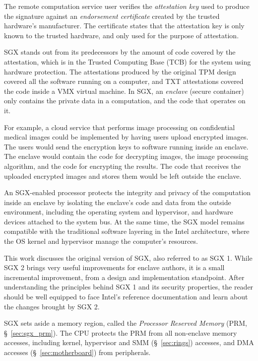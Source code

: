 The remote computation service user verifies the \textit{attestation key} used
to produce the signature against an \textit{endorsement certificate} created by
the trusted hardware's manufacturer. The certificate states that the
attestation key is only known to the trusted hardware, and only used for the
purpose of attestation.

SGX stands out from its predecessors by the amount of code covered by the
attestation, which is in the Trusted Computing Base (TCB) for the system using
hardware protection. The attestations produced by the original TPM design
covered all the software running on a computer, and TXT attestations covered
the code inside a VMX \cite{uhlig2005vmx} virtual machine. In SGX, an
\textit{enclave} (secure container) only contains the private data in a
computation, and the code that operates on it.

For example, a cloud service that performs image processing on confidential
medical images could be implemented by having users upload encrypted images.
The users would send the encryption keys to software running inside an enclave.
The enclave would contain the code for decrypting images, the image processing
algorithm, and the code for encrypting the results. The code that receives the
uploaded encrypted images and stores them would be left outside the enclave.

An SGX-enabled processor protects the integrity and privacy of the computation
inside an enclave by isolating the enclave's code and data from the outside
environment, including the operating system and hypervisor, and hardware
devices attached to the system bus. At the same time, the SGX model remains
compatible with the traditional software layering in the Intel architecture,
where the OS kernel and hypervisor manage the computer's resources.

This work discusses the original version of SGX, also referred to as SGX 1.
While SGX 2 brings very useful improvements for enclave authors, it is a small
incremental improvement, from a design and implementation standpoint. After
understanding the principles behind SGX 1 and its security properties, the
reader should be well equipped to face Intel's reference documentation and
learn about the changes brought by SGX 2.


\label{sec:intro_sgx}

SGX sets aside a memory region, called the \textit{Processor Reserved Memory}
(PRM, \S~\ref{sec:sgx_prm}). The CPU protects the PRM from all non-enclave
memory accesses, including kernel, hypervisor and SMM (\S~\ref{sec:rings})
accesses, and DMA accesses (\S~\ref{sec:motherboard}) from peripherals.

